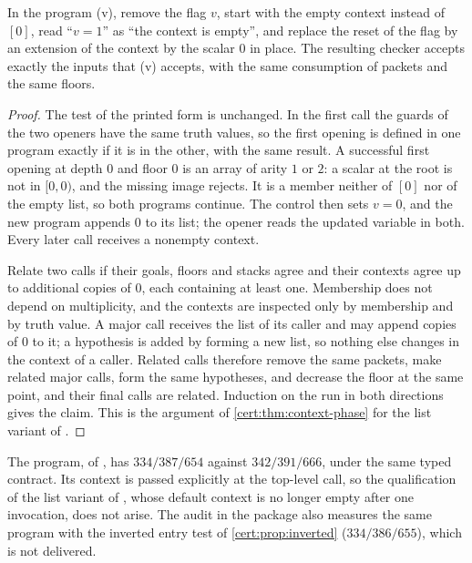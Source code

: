 \begin{proposition}\label{cert:prop:empty-phase}
In the program (v), remove the flag $v$, start with the empty context instead
of $[0]$, read ``$v=1$'' as ``the context is empty'', and replace the reset
of the flag by an extension of the context by the scalar $0$ in place. The
resulting checker accepts exactly the inputs that (v) accepts, with the same
consumption of packets and the same floors.
\end{proposition}
\begin{proof}
The test of the printed form is unchanged. In the first call the guards of the
two openers have the same truth values, so the first opening is defined in
one program exactly if it is in the other, with the same result. A successful
first opening at depth $0$ and floor $0$ is an array of arity $1$ or $2$: a
scalar at the root is not in $[0,0)$, and the missing image rejects. It is a
member neither of $[0]$ nor of the empty list, so both programs continue. The
control then sets $v=0$, and the new program appends $0$ to its list; the
opener reads the updated variable in both. Every later call receives a
nonempty context.

Relate two calls if their goals, floors and stacks agree and their contexts
agree up to additional copies of $0$, each containing at least one. Membership
does not depend on multiplicity, and the contexts are inspected only by
membership and by truth value. A major call receives the list of its caller
and may append copies of $0$ to it; a hypothesis is added by forming a new
list, so nothing else changes in the context of a caller. Related calls
therefore remove the same packets, make related major calls, form the same
hypotheses, and decrease the floor at the same point, and their final calls
are related. Induction on the run in both directions gives the claim. This is
the argument of \cref{cert:thm:context-phase} for the list variant of
.
\end{proof}

The program, of , has $334/387/654$ against
$342/391/666$, under the same typed contract. Its context is passed
explicitly at the top-level call, so the qualification of the list variant of
, whose default context is no longer empty after one
invocation, does not arise. The audit in the package also measures the same
program with the inverted entry test of \cref{cert:prop:inverted}
($334/386/655$), which is not delivered.


